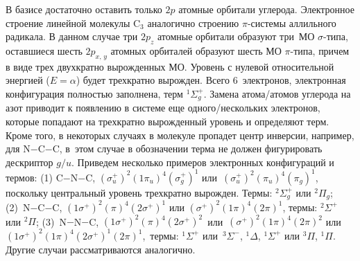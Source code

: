  В базисе достаточно оставить только $2p$ атомные орбитали углерода. Электронное строение линейной молекулы $\text{C}_3$ аналогично строению $\pi$-системы аллильного радикала. В данном случае три $2p_z$ атомные орбитали образуют три~МО $\sigma$-типа, оставшиеся шесть $2p_{x,\,y}$ атомных орбиталей образуют шесть МО $\pi$-типа, причем в виде трех двухкратно вырожденных МО. Уровень с нулевой относительной энергией ($E=\alpha$) будет трехкратно вырожден. Всего 6~электронов, электронная конфигурация полностью заполнена, терм $^1\Sigma^+_g$. Замена атома/атомов углерода на азот приводит к появлению в системе еще одного/нескольких электронов, которые попадают на трехкратно вырожденный уровень и определяют терм. Кроме того, в некоторых случаях в молекуле пропадет центр инверсии, например, для N$-$C$-$C, в~этом случае в обозначении терма не должен фигурировать дескриптор $g/u$. Приведем несколько примеров электронных конфигураций и термов: (1) C$-$N$-$C, $(\sigma^+_u)^2(1\pi_u)^4(\sigma^+_g)^1$ или~$(\sigma^+_u)^2(\pi_u)^4(\pi_g)^1$, поскольку центральный уровень трехкратно вырожден. Термы: $^2\Sigma^+_g$ или $^2\Pi_g$; (2)~N$-$C$-$C, $(1\sigma^+)^2(\pi)^4(2\sigma^+)^1$ или $(\sigma^+)^2(1\pi)^4(2\pi)^1$, термы: $^2\Sigma^+$ или $^2\Pi$; (3)~N$-$N$-$C, $(1\sigma^+)^2(\pi)^4(2\sigma^+)^2$ $\,$или$\,$ $(\sigma^+)^2(1\pi)^4(2\pi)^2$ или $(1\sigma^+)^2(1\pi)^4(2\sigma^+)^1(2\pi)^1$,$\,$ термы: $^1\Sigma^+$ или~$^3\Sigma^-$, $^1\Delta$, $^1\Sigma^+$ или $^3\Pi$, $^1\Pi$. Другие случаи рассматриваются аналогично.\par
\newpage

